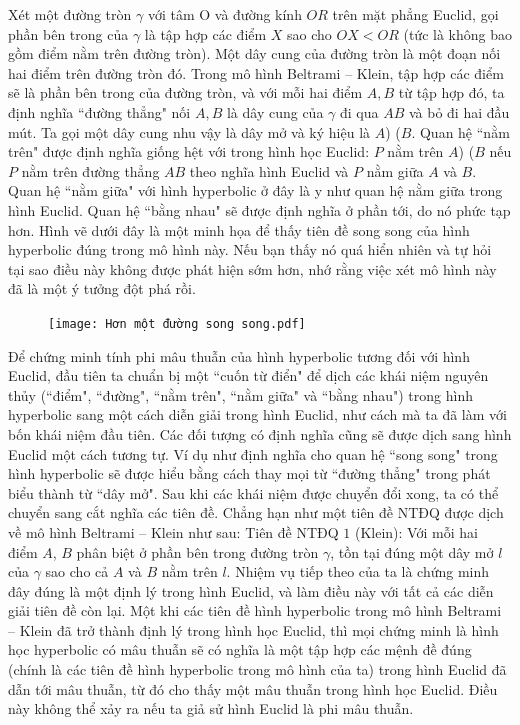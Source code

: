\begin{multicols}{2}
	Xét một đường tròn $\gamma$ với tâm O và đường kính $OR$ trên mặt phẳng Euclid, gọi phần bên trong của $ \gamma$ là tập hợp các điểm $X$ sao cho $OX < OR$ (tức là không bao gồm điểm nằm trên đường tròn). Một dây cung của đường tròn là một đoạn nối hai điểm trên đường tròn đó.
	Trong mô hình Beltrami -- Klein, tập hợp các điểm sẽ là phần bên trong của đường tròn, và với mỗi hai điểm $A, B$ từ tập hợp đó, ta định nghĩa ``đường thẳng" nối $A, B$ là dây cung của $ \gamma$ đi qua $AB$ và bỏ đi hai đầu mút. Ta gọi một dây cung nhu vậy là dây mở và ký hiệu là $A$) ($B$. Quan hệ ``nằm trên" được định nghĩa giống hệt với trong hình học Euclid: $P$ nằm trên $A$) ($B$ nếu $P$ nằm trên đường thẳng $AB$ theo nghĩa hình Euclid và $P$ nằm giữa $A$ và $B$. Quan hệ ``nằm giữa" với hình hyperbolic ở đây là y như quan hệ nằm giữa trong hình Euclid. Quan hệ ``bằng nhau" sẽ được định nghĩa ở phần tới, do nó phức tạp hơn.
	Hình vẽ dưới đây là một minh họa để thấy tiên đề song song của hình hyperbolic đúng trong mô hình này. Nếu bạn thấy nó quá hiển nhiên và tự hỏi tại sao điều này không được phát hiện sớm hơn, nhớ rằng việc xét mô hình này đã là một ý tưởng đột phá rồi. 
	\begin{figure}[H]
		\vspace*{-5pt}
		\centering
		\captionsetup{labelformat= empty, justification=centering}
		\texttt{[image: Hơn một đường song song.pdf]}
		\vspace*{-10pt}
	\end{figure}
	Để chứng minh tính phi mâu thuẫn của hình hyperbolic tương đối với hình Euclid, đầu tiên ta chuẩn bị một ``cuốn từ điển" để dịch các khái niệm nguyên thủy (``điểm", ``đường", ``nằm trên", ``nằm giữa" và ``bằng nhau") trong hình hyperbolic sang một cách diễn giải trong hình Euclid, như cách mà ta đã làm với bốn khái niệm đầu tiên. Các đối tượng có định nghĩa cũng sẽ được dịch sang hình Euclid một cách tương tự. Ví dụ như định nghĩa cho quan hệ ``song song" trong hình hyperbolic sẽ được hiểu bằng cách thay mọi từ ``đường thẳng" trong phát biểu thành từ ``dây mở". Sau khi các khái niệm được chuyển đổi xong, ta có thể chuyển sang cắt nghĩa các tiên đề. Chẳng hạn như một tiên đề NTĐQ được dịch về mô hình Beltrami -- Klein như sau:
	\vskip 0.1cm
	Tiên đề NTĐQ $1$ (Klein): Với mỗi hai điểm $A$, $B$ phân biệt ở phần bên trong đường tròn $\gamma$, tồn tại đúng một dây mở $l$ của $\gamma$ sao cho cả $A$ và $B$ nằm trên $l$.
	\vskip 0.1cm
	Nhiệm vụ tiếp theo của ta là chứng minh đây đúng là một định lý trong hình Euclid, và làm điều này với tất cả các diễn giải tiên đề còn lại. Một khi các tiên đề hình hyperbolic trong mô hình Beltrami -- Klein đã trở thành định lý trong hình học Euclid, thì mọi chứng minh là hình học hyperbolic có mâu thuẫn sẽ có nghĩa là một tập hợp các mệnh đề đúng (chính là các tiên đề hình hyperbolic trong mô hình của ta) trong hình Euclid đã dẫn tới mâu thuẫn, từ đó cho thấy một mâu thuẫn trong hình học Euclid. Điều này không thể xảy ra nếu ta giả sử hình Euclid là phi mâu thuẫn.

\end{multicols}
